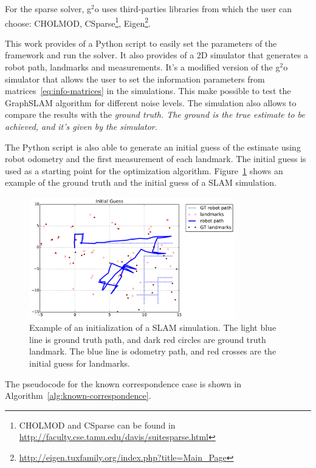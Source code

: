 For the sparse solver, g$^2$o uses third-parties libraries from which the user can choose: CHOLMOD, CSparse\footnote{CHOLMOD and CSparse can be found in \url{http://faculty.cse.tamu.edu/davis/suitesparse.html}}, Eigen\footnote{\url{http://eigen.tuxfamily.org/index.php?title=Main_Page}}. 

This work provides of a Python script to easily set the parameters of the framework and run the solver. It also provides of a 2D simulator that generates a robot path, landmarks and measurements. It's a modified version of the g$^2$o simulator that allows the user to set the information parameters from matrices~\eqref{eq:info-matrices} in the simulations. This make possible to test the GraphSLAM algorithm for different noise levels. The simulation also allows to compare the results with the \it{ground truth}. The ground is the true estimate to be achieved, and it's given by the simulator. 

The Python script is also able to generate an initial guess of the estimate using robot odometry and the first measurement of each landmark. The initial guess is used as a starting point for the optimization algorithm. Figure~\ref{fig:simulation} shows an example of the ground truth and the initial guess of a SLAM simulation.

\begin{figure}[htbp!]
    \centering
    \includegraphics[width=0.8\textwidth]{imagenes/guess_op_100_oa_100_lp_100_ds_100.pdf}
    \caption[Example of an initialization of a SLAM simulation.]{Example of an initialization of a SLAM simulation. The light blue line is ground truth path, and dark red circles are ground truth landmark. The blue line is odometry path, and red crosses are the initial guess for landmarks.}
    \label{fig:simulation}
\end{figure}

The pseudocode for the known correspondence case is shown in Algorithm~\ref{alg:known-correspondence}.

